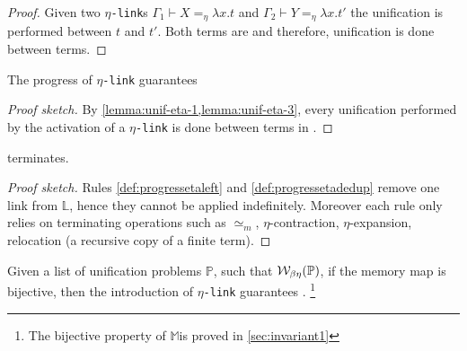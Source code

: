 \documentclass[sigconf,natbib=false,review]{acmart}
\newcommand{\UnifRel}{\ensuremath{\simeq}}
\newcommand{\Ue}{\ensuremath{\UnifRel_m}\xspace}
\newcommand{\linkMacro}[1]{\ensuremath{#1}\texttt{-link}\xspace}
\newcommand{\linketa} {\linkMacro{\eta}}
\newcommand{\linketaM}[3]{\ensuremath{#1 \vdash #2 =_\eta #3}}
\newcommand{\linkStore}{\texorpdfstring{\ensuremath{\mathbb{L}}\xspace}{L}}
\newcommand{\mapStore}{\texorpdfstring{\ensuremath{\mathbb{M}}\xspace}{M}}
\newcommand{\foUnifPb}{\ensuremath{\mathbb{P}}\xspace}
\begin{document}
\begin{proof}
  Given two \linketa{}s \linketaM{\Gamma_1}{X}{\lambda x.t} and
  \linketaM{\Gamma_2}{Y}{\lambda x.t'} 
  the unification is performed between $t$ and $t'$. Both terms are
  \wellb and therefore, unification is done between \wellb terms.
\end{proof}

\begin{lemma}
  The progress of \linketa guarantees 
  \label{lemma:unif-wellb}
\end{lemma}

\begin{proof}[Proof sketch]
  By \cref{lemma:unif-eta-1,lemma:unif-eta-3}, every
  unification performed by the activation of a \linketa is done between
  terms in \wellb.
\end{proof}

\begin{lemma}
   terminates.
  \label{lemma:prog-eta-terminates}
\end{lemma}

\begin{proof}[Proof sketch]
  Rules \cref{def:progressetaleft} and
  \cref{def:progressetadedup} remove one link from \linkStore, hence they
  cannot be applied indefinitely.
  Moreover each rule only relies on terminating operations such as \Ue,
  $\eta$-contraction, $\eta$-expansion, relocation (a recursive copy of a
  finite term).
\end{proof}  

\begin{theorem}
  Given a list of unification problems \foUnifPb, such that
  $\wellb_{\beta \eta}(\foUnifPb)$, if the 
  memory map is bijective, then
  the introduction 
  of \linketa guarantees .
  \footnote{The bijective property of \mapStore is proved in \cref{sec:invariant1}}
  \label{lemma:fidelity-maybeeta}
\end{theorem}
\end{document}
